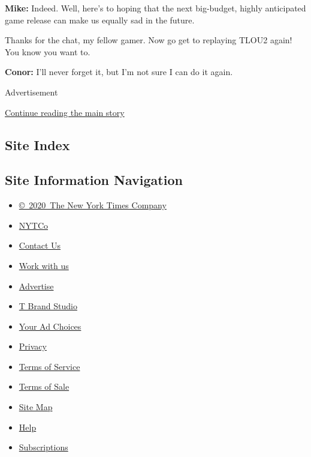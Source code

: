 \textbf{Mike:} Indeed. Well, here's to hoping that the next big-budget,
highly anticipated game release can make us equally sad in the future.

Thanks for the chat, my fellow gamer. Now go get to replaying TLOU2
again! You know you want to.

\textbf{Conor:} I'll never forget it, but I'm not sure I can do it
again.

Advertisement

\protect\hyperlink{after-bottom}{Continue reading the main story}

\hypertarget{site-index}{%
\subsection{Site Index}\label{site-index}}

\hypertarget{site-information-navigation}{%
\subsection{Site Information
Navigation}\label{site-information-navigation}}

\begin{itemize}
\tightlist
\item
  \href{https://help.nytimes3xbfgragh.onion/hc/en-us/articles/115014792127-Copyright-notice}{©~2020~The
  New York Times Company}
\end{itemize}

\begin{itemize}
\tightlist
\item
  \href{https://www.nytco.com/}{NYTCo}
\item
  \href{https://help.nytimes3xbfgragh.onion/hc/en-us/articles/115015385887-Contact-Us}{Contact
  Us}
\item
  \href{https://www.nytco.com/careers/}{Work with us}
\item
  \href{https://nytmediakit.com/}{Advertise}
\item
  \href{http://www.tbrandstudio.com/}{T Brand Studio}
\item
  \href{https://www.nytimes3xbfgragh.onion/privacy/cookie-policy\#how-do-i-manage-trackers}{Your
  Ad Choices}
\item
  \href{https://www.nytimes3xbfgragh.onion/privacy}{Privacy}
\item
  \href{https://help.nytimes3xbfgragh.onion/hc/en-us/articles/115014893428-Terms-of-service}{Terms
  of Service}
\item
  \href{https://help.nytimes3xbfgragh.onion/hc/en-us/articles/115014893968-Terms-of-sale}{Terms
  of Sale}
\item
  \href{https://spiderbites.nytimes3xbfgragh.onion}{Site Map}
\item
  \href{https://help.nytimes3xbfgragh.onion/hc/en-us}{Help}
\item
  \href{https://www.nytimes3xbfgragh.onion/subscription?campaignId=37WXW}{Subscriptions}
\end{itemize}

